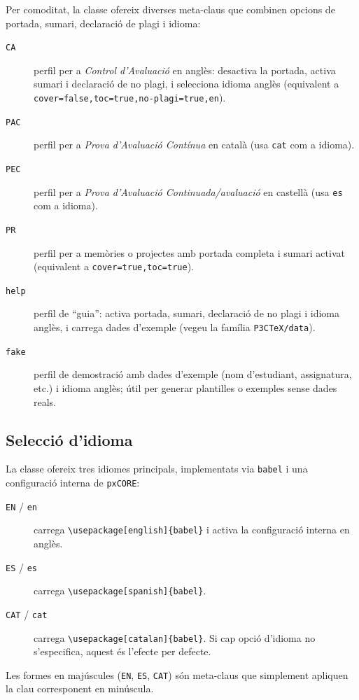 \documentclass[default]{P3CTeX}
\begin{document}
Per comoditat, la classe ofereix diverses meta-claus que combinen
opcions de portada, sumari, declaració de plagi i idioma:

\begin{description}
  \item[\texttt{CA}] perfil per a \emph{Control d'Avaluació} en anglès:
    desactiva la portada, activa sumari i declaració de no plagi, i
    selecciona idioma anglès (equivalent a
    \verb|cover=false,toc=true,no-plagi=true,en|).
  \item[\texttt{PAC}] perfil per a \emph{Prova d'Avaluació Contínua} en
    català (usa \verb|cat| com a idioma).
  \item[\texttt{PEC}] perfil per a \emph{Prova d'Avaluació
    Continuada/avaluació} en castellà (usa \verb|es| com a idioma).
  \item[\texttt{PR}] perfil per a memòries o projectes amb portada
    completa i sumari activat (equivalent a
    \verb|cover=true,toc=true|).
  \item[\texttt{help}] perfil de ``guia'': activa portada, sumari,
    declaració de no plagi i idioma anglès, i carrega dades d'exemple
    (vegeu la família \verb|P3CTeX/data|).
  \item[\texttt{fake}] perfil de demostració amb dades d'exemple
    (nom d'estudiant, assignatura, etc.) i idioma anglès; útil per
    generar plantilles o exemples sense dades reals.
\end{description}

\subsection*{Selecció d'idioma}

La classe ofereix tres idiomes principals, implementats via
\texttt{babel} i una configuració interna de \texttt{pxCORE}:

\begin{description}
  \item[\texttt{EN} / \texttt{en}] carrega \verb|\usepackage[english]{babel}|
    i activa la configuració interna en anglès.
  \item[\texttt{ES} / \texttt{es}] carrega \verb|\usepackage[spanish]{babel}|.
  \item[\texttt{CAT} / \texttt{cat}] carrega \verb|\usepackage[catalan]{babel}|. Si cap
    opció d'idioma no s'especifica, aquest és l'efecte per defecte.
\end{description}

Les formes en majúscules (\verb|EN|, \verb|ES|, \verb|CAT|) són
meta-claus que simplement apliquen la clau corresponent en minúscula.
\end{document}
